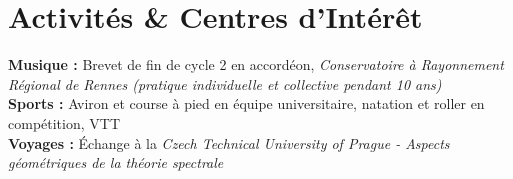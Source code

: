 \section{Activités \& Centres d'Intérêt}
\vspace{0.1cm}

\textbf{Musique :} Brevet de fin de cycle 2 en accordéon, \textit{Conservatoire à Rayonnement Régional de Rennes (pratique individuelle et collective pendant 10 ans)}\\

\textbf{Sports :} Aviron et course à pied en équipe universitaire, natation et roller en compétition, VTT\\

\textbf{Voyages :}
Échange à la \textit{Czech Technical University of Prague - Aspects géométriques de la théorie spectrale}\\
